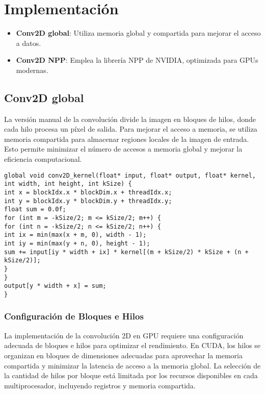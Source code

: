 \section{Implementación}

\begin{itemize}
\item \textbf{Conv2D global}: Utiliza memoria global y compartida para mejorar el acceso a datos.
\item \textbf{Conv2D NPP}: Emplea la librería NPP de NVIDIA, optimizada para GPUs modernas.
\end{itemize}

\subsection{Conv2D global}
La versión manual de la convolución divide la imagen en bloques de hilos, donde cada hilo procesa un píxel de salida. Para mejorar el acceso a memoria, se utiliza memoria compartida para almacenar regiones locales de la imagen de entrada. Esto permite minimizar el número de accesos a memoria global y mejorar la eficiencia computacional.

\begin{lstlisting}
global void conv2D_kernel(float* input, float* output, float* kernel, int width, int height, int kSize) {
int x = blockIdx.x * blockDim.x + threadIdx.x;
int y = blockIdx.y * blockDim.y + threadIdx.y;
float sum = 0.0f;
for (int m = -kSize/2; m <= kSize/2; m++) {
for (int n = -kSize/2; n <= kSize/2; n++) {
int ix = min(max(x + m, 0), width - 1);
int iy = min(max(y + n, 0), height - 1);
sum += input[iy * width + ix] * kernel[(m + kSize/2) * kSize + (n + kSize/2)];
}
}
output[y * width + x] = sum;
}
\end{lstlisting}


\subsubsection{Configuración de Bloques e Hilos}

La implementación de la convolución 2D en GPU requiere una configuración adecuada de bloques e hilos para optimizar el rendimiento. En CUDA, los hilos se organizan en bloques de dimensiones adecuadas para aprovechar la memoria compartida y minimizar la latencia de acceso a la memoria global. La selección de la cantidad de hilos por bloque está limitada por los recursos disponibles en cada multiprocesador, incluyendo registros y memoria compartida.


